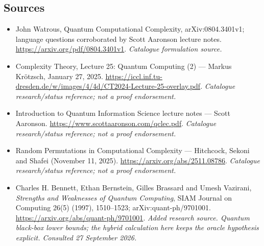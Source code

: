 \documentclass[11pt,a4paper]{article}
\begin{document}
\subsection{Sources}
\begin{itemize}\raggedright
\item[\textnormal{[S1]}]\hypertarget{source:30006681:1}{} John Watrous, Quantum Computational Complexity, arXiv:0804.3401v1; language questions corroborated by Scott Aaronson lecture notes.
\url{https://arxiv.org/pdf/0804.3401v1}.
{\small\textit{Catalogue formulation source.}}
\item[\textnormal{[S2]}]\hypertarget{source:30006681:2}{} Complexity Theory, Lecture 25: Quantum Computing (2) — Markus Krötzsch, January 27, 2025.
\url{https://iccl.inf.tu-dresden.de/w/images/4/4d/CT2024-Lecture-25-overlay.pdf}.
{\small\textit{Catalogue research/status reference; not a proof endorsement.}}
\item[\textnormal{[S3]}]\hypertarget{source:30006681:3}{} Introduction to Quantum Information Science lecture notes — Scott Aaronson.
\url{https://www.scottaaronson.com/qclec.pdf}.
{\small\textit{Catalogue research/status reference; not a proof endorsement.}}
\item[\textnormal{[S4]}]\hypertarget{source:30006681:4}{} Random Permutations in Computational Complexity — Hitchcock, Sekoni and Shafei (November 11, 2025).
\url{https://arxiv.org/abs/2511.08786}.
{\small\textit{Catalogue research/status reference; not a proof endorsement.}}
\item[\textnormal{[E1]}]\hypertarget{extra:30006681:1}{} Charles H. Bennett, Ethan Bernstein, Gilles Brassard and Umesh Vazirani, \emph{Strengths and Weaknesses of Quantum Computing}, SIAM Journal on Computing 26(5) (1997), 1510--1523; arXiv:quant-ph/9701001.
\url{https://arxiv.org/abs/quant-ph/9701001}.
{\small\textit{Added research source. Quantum black-box lower bounds; the hybrid calculation here keeps the oracle hypothesis explicit. Consulted 27 September 2026.}}
\end{itemize}

\end{document}
